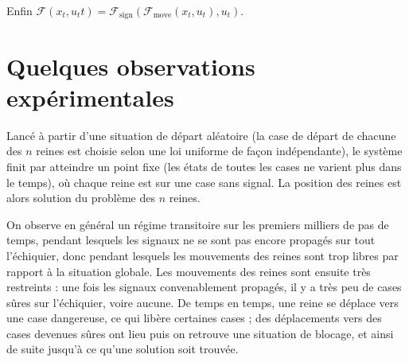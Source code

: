 \documentclass[11pt, openany]{article}
\begin{document}
\noindent
Enfin $\mathcal{F}(x_t, u_tt) = \mathcal{F}_{\mathrm{sign}}(\mathcal{F}_{\mathrm{move}}(x_t, u_t), u_t)$.

\section*{Quelques observations expérimentales}


Lancé à partir d'une situation de départ aléatoire (la case de départ de chacune des $n$ reines est choisie selon une loi uniforme de façon indépendante), le système finit par atteindre un point fixe (les états de toutes les cases ne varient plus dans le temps), où chaque reine est sur une case sans signal. La position des reines est alors solution du problème des $n$ reines.

On observe en général un régime transitoire sur les premiers milliers de pas de temps, pendant lesquels les signaux ne se sont pas encore propagés sur tout l'échiquier, donc pendant lesquels les mouvements des reines sont trop libres par rapport à la situation globale. Les mouvements des reines sont ensuite très restreints : une fois les signaux convenablement propagés, il y a très peu de cases sûres sur l'échiquier, voire aucune. De temps en temps, une reine se déplace vers une case dangereuse, ce qui libère certaines cases ; des déplacements vers des cases devenues sûres ont lieu puis on retrouve une situation de blocage, et ainsi de suite jusqu'à ce qu'une solution soit trouvée.
\end{document}
